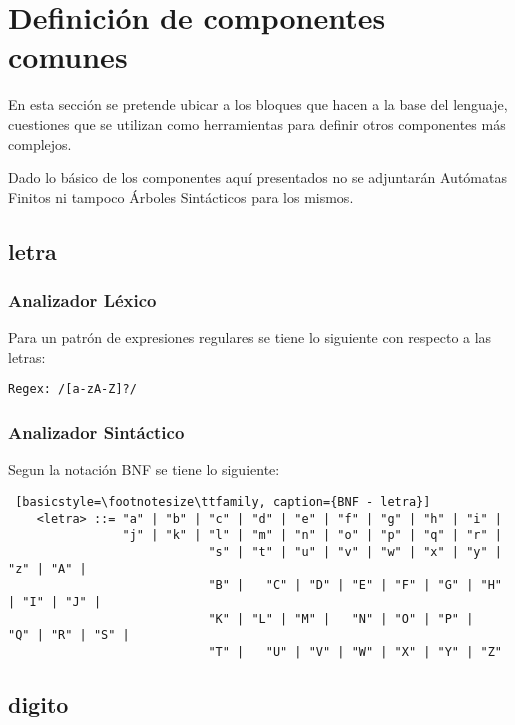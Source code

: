 \section{Definición de componentes comunes}
\label{sub:componentes_comunes}

En esta sección se pretende ubicar a los bloques que hacen a la base del
lenguaje, cuestiones que se utilizan como herramientas para definir otros
componentes más complejos.

Dado lo básico de los componentes aquí presentados no se adjuntarán Autómatas
Finitos ni tampoco Árboles Sintácticos para los mismos.

\subsection{letra}
\label{sub:letra}

\subsubsection{Analizador Léxico}

Para un patrón de expresiones regulares se tiene lo
siguiente con respecto a las letras:

\begin{lstlisting}[basicstyle=\footnotesize\ttfamily, caption={Regex - letra}]
Regex: /[a-zA-Z]?/
\end{lstlisting}

\subsubsection{Analizador Sintáctico}

Segun la notación BNF se tiene lo siguiente:

\begin{lstlisting} [basicstyle=\footnotesize\ttfamily, caption={BNF - letra}]
	<letra> ::= "a" | "b" | "c" | "d" | "e" | "f" | "g" | "h" | "i" |
	            "j" | "k" |	"l" | "m" | "n" | "o" | "p" | "q" | "r" |
							"s" | "t" | "u" | "v" | "w" | "x" | "y" |	"z" | "A" |
							"B" |	"C" | "D" | "E" | "F" | "G" | "H" | "I" | "J" |
							"K" | "L" | "M" |	"N" | "O" | "P" |	"Q" | "R" | "S" |
							"T" |	"U" | "V" | "W" | "X" | "Y" | "Z"
\end{lstlisting}


\subsection{digito}
\label{sub:digito}

